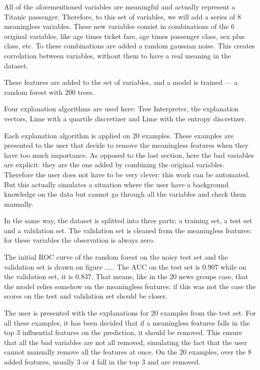 \documentclass[a4paper,11pt]{kth-mag}
\begin{document}
All of the aforementioned variables are meaningful and actually represent a Titanic passenger. Therefore, to this set of variables, we will add a series of 8 meaningless variables. These new variables consist in combinations of the 6 original variables, like age times ticket fare, age times passenger class, sex plus class, etc. To these combinations are added a random gaussian noise. This creates correlation between variables, without them to have a real meaning in the dataset.

These features are added to the set of variables, and a model is trained --- a random forest with 200 trees.

Four explanation algorithms are used here: Tree Interpreter, the explanation vectors, Lime with a quartile discretizer and Lime with the entropy discretizer.

Each explanation algorithm is applied on 20 examples. These examples are presented to the user that decide to remove the meaningless features when they have too much importance. As opposed to the last section, here the bad variables are explicit: they are the one added by combining the original variables. Therefore the user does not have to be very clever: this work can be automated. But this actually simulates a situation where the user have a background knowledge on the data but cannot go through all the variables and check them manually.

In the same way, the dataset is splitted into three parts: a training set, a test set and a validation set. The validation set is cleaned from the meaningless features: for these variables the observation is always zero.

The initial ROC curve of the random forest on the noisy test set and the validation set is drawn on figure ..... The AUC on the test set is 0.907 while on the validation set, it is 0.837. That means, like in the 20 news groups case, that the model relies somehow on the meaningless features: if this was not the case the scores on the test and validation set should be closer.

The user is presented with the explanations for 20 examples from the test set. For all these examples, it has been decided that if a meaningless features falls in the top 3 influential features on the prediction, it should be removed. This ensure that all the bad variables are not all removed, simulating the fact that the user cannot manually remove all the features at once. On the 20 examples, over the 8 added features, usually 3 or 4 fall in the top 3 and are removed.
\end{document}
